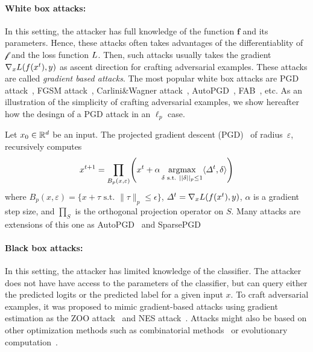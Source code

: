 \paragraph{White box attacks:} In this setting, the attacker has  full knowledge of the function $\mathbf{f}$ and its parameters. Hence, these attacks often takes advantages of the differentiablity of $\mathcal{f}$ and the loss function $L$. Then, such attacks usually takes the gradient $\nabla_x \loss\left(f\left(x^t\right),y\right)$ as ascent direction for crafting adversarial examples.  These attacks are called \emph{gradient based attacks}. The most popular white box attacks are PGD attack~\cite{kurakin2016adversarial,madry2017towards}, FGSM attack~\citep{goodfellow2014explaining}, Carlini\&Wagner attack~\citep{carlini2017towards}, AutoPGD~\citep{Croce2020MinimallyDA}, FAB~\citep{Croce2020MinimallyDA}, etc. As an illustration of the simplicity of crafting adversarial examples, we show hereafter how the desingn of a PGD attack in an $\ell_p$ case.
\begin{example*} Let $x_0\in\mathbb{R}^d$ be an input. The projected gradient descent (PGD)~\cite{kurakin2016adversarial,madry2017towards} of radius~$\varepsilon$, recursively computes
\begin{align*}
x^{t+1}=\prod_{B_p(x,\varepsilon)}\left(x^t
+\alpha \argmaxB_{\delta\text{ s.t. }||\delta||_p\leq1} \langle\Delta^t,\delta \rangle\right)
\end{align*}
where $B_p(x,\varepsilon) = \{ x+\tau \text{~s.t.~} \lVert\tau\rVert_p \leq \epsilon\}$, $\Delta^t=\nabla_x \loss\left(f\left(x^t\right),y\right)$, $\alpha$ is a gradient step size, and $\prod_S$ is the orthogonal projection operator on $S$. Many attacks are extensions of this one as AutoPGD~\citep{Croce2020ReliableEO} and SparsePGD~\citep{tramer2019adversarial}
\end{example*}
\paragraph{Black box attacks:} In this setting, the attacker has limited knowledge of the classifier. The attacker does not have have access to the parameters of the classifier, but can query either the predicted logits or the predicted label for a given input $x$. To craft adversarial examples, it was proposed to mimic gradient-based attacks using gradient estimation as the ZOO attack~\citep{chen2017zoo} and NES attack~\citep{ilyas2018black,ilyas2019adversarial}. Attacks might also be based on other optimization methods such as combinatorial methods~\citep{moon2019parsimonious} or evolutionary computation~\citep{andriushchenko2019square}.










